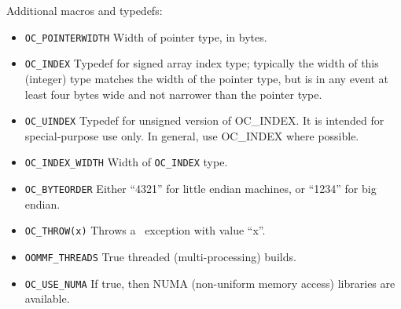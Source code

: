{Additional macros and typedefs:
\begin{itemize}
\item{\texttt{OC\_POINTERWIDTH}} \gbs Width of pointer type, in bytes.
\item{\texttt{OC\_INDEX}} \gbs Typedef for signed array index type;
  typically the width of this (integer) type matches the width of the
  pointer type, but is in any event at least four bytes wide and not
  narrower than the pointer type.
\item{\texttt{OC\_UINDEX}} \gbs Typedef for unsigned version of
  OC\_INDEX.  It is intended for special-purpose use only.  In general,
  use OC\_INDEX where possible.
\item{\texttt{OC\_INDEX\_WIDTH}} \gbs Width of \texttt{OC\_INDEX} type.
\item{\texttt{OC\_BYTEORDER}} Either ``4321'' for little endian machines,
  or ``1234'' for big endian.
\item{\texttt{OC\_THROW(x)}} \gbs Throws a \Cplusplus\ exception with
  value ``x''.
\item{\texttt{OOMMF\_THREADS}} \gbs True threaded (multi-processing) builds.
\item{\texttt{OC\_USE\_NUMA}} \gbs If true, then NUMA (non-uniform memory
  access) libraries are available.
\end{itemize}
}
